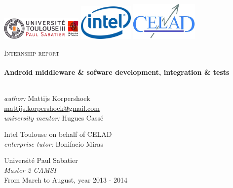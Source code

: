 \begin{titlepage}


\begin{minipage}{\textwidth}
\includegraphics[width=0.30\textwidth]{./src/img/logoups.jpg}
\hfill \includegraphics[width=0.20\textwidth]{./src/img/logointel.jpg} \hfill
\includegraphics[width=0.25\textwidth]{./src/img/logocelad.jpg}
\end{minipage}

\begin{center}

\vfill

\textsc{\LARGE Internship report}\\[0.5cm]

\titleRule \\[0.4cm]
{ \huge \bfseries Android middleware \& sofware development, integration \& tests}\\[0.4cm]

\titleRule \\[1.5cm]

\vfill

\begin{minipage}{0.49\textwidth}
\begin{flushleft} \large
  \emph{author:} Mattijs Korpershoek \\
\href{mailto:mattijs.korpershoek@gmail.com}{mattijs.korpershoek@gmail.com} \\
\emph{university mentor:} Hugues Cassé
\end{flushleft}
\end{minipage}
\begin{minipage}{0.49\textwidth}
\begin{flushright} \large
Intel Toulouse on behalf of CELAD \\
\emph{enterprise tutor:} Bonifacio Miras
\end{flushright}
\end{minipage}

\vfill

Université Paul Sabatier \\
\emph{Master 2 CAMSI} \\
From March to August, year 2013 - 2014

\end{center}

\end{titlepage}
